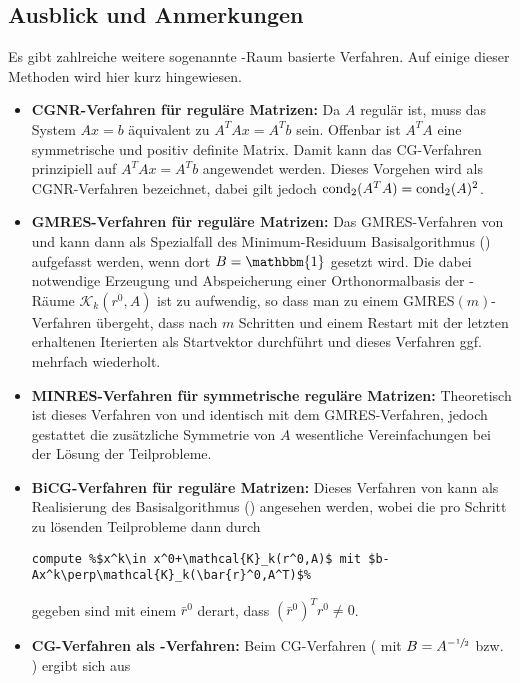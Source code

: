 \subsection{Ausblick und Anmerkungen}

Es gibt zahlreiche weitere sogenannte -Raum basierte Verfahren. Auf einige dieser Methoden wird hier kurz hingewiesen.
\begin{itemize}
	\item \textbf{CGNR-Verfahren für reguläre Matrizen:} Da $A$ regulär ist, muss das System $Ax=b$ äquivalent zu $A^TAx=A^Tb$ sein. Offenbar ist $A^TA$ eine symmetrische und positiv definite Matrix. Damit kann das CG-Verfahren prinzipiell auf $A^TAx=A^Tb$ angewendet werden. Dieses Vorgehen wird als CGNR-Verfahren bezeichnet, dabei gilt jedoch $\operatorname{cond}_2(A^TA)=\operatorname{cond}_2(A)^2$.
	\item \textbf{GMRES-Verfahren für reguläre Matrizen:} Das GMRES-Verfahren von  und  kann dann als Spezialfall des Minimum-Residuum Basisalgorithmus () aufgefasst werden, wenn dort $B=\mathbbm{1}$ gesetzt wird. Die dabei notwendige Erzeugung und Abspeicherung einer Orthonormalbasis der -Räume $\mathcal{K}_k(r^0,A)$ ist zu aufwendig, so dass man zu einem GMRES$(m)$-Verfahren übergeht, dass nach $m$ Schritten und einem Restart mit der letzten erhaltenen Iterierten als Startvektor durchführt und dieses Verfahren ggf. mehrfach wiederholt.
	\item \textbf{MINRES-Verfahren für symmetrische reguläre Matrizen:} Theoretisch ist dieses Verfahren von  und  identisch mit dem GMRES-Verfahren, jedoch gestattet die zusätzliche Symmetrie von $A$ wesentliche Vereinfachungen bei der Lösung der Teilprobleme.
	\item \textbf{BiCG-Verfahren für reguläre Matrizen:} Dieses Verfahren von  kann als Realisierung des  Basisalgorithmus () angesehen werden, wobei die pro Schritt zu lösenden Teilprobleme dann durch
	\begin{lstlisting}
compute %$x^k\in x^0+\mathcal{K}_k(r^0,A)$ mit $b-Ax^k\perp\mathcal{K}_k(\bar{r}^0,A^T)$%
	\end{lstlisting}
	gegeben sind mit einem $\bar{r}^0$ derart, dass $(\bar{r}^0)^Tr^0\neq 0$.
	\item \textbf{CG-Verfahren als -Verfahren:} Beim CG-Verfahren ( mit $B=A^{-\sfrac{1}{2}}$ bzw. ) ergibt sich aus 

\end{itemize}
